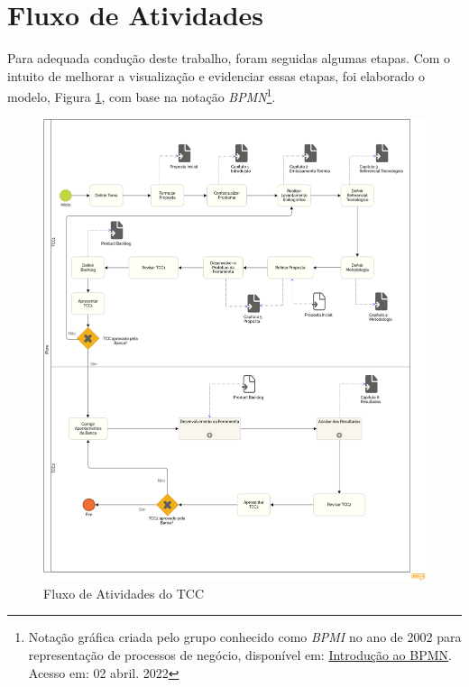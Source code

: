\section{Fluxo de Atividades}

\label{sec:fluxo_atividade}
    
Para adequada condução deste trabalho, foram seguidas algumas etapas. Com o intuito de melhorar a visualização e evidenciar essas etapas, foi elaborado o modelo, Figura \ref{fig:bpmn_geral}, com base na notação \textit{BPMN}\footnote{Notação gráfica criada pelo grupo conhecido como \textit{BPMI} no ano de 2002 para representação de processos de negócio, disponível em: \href{https://www.devmedia.com.br/introducao-ao-business-process-modeling-notation-bpmn/29892}{Introdução ao BPMN}. Acesso em: 02 abril. 2022}.

\begin{figure}[H]
    \begin{center}
        \caption{Fluxo de Atividades do TCC}
        \label{fig:bpmn_geral}
        \includegraphics[scale=0.3]{figuras/Metodologia/bpmn_geral.png}
    \end{center}
\end{figure}

